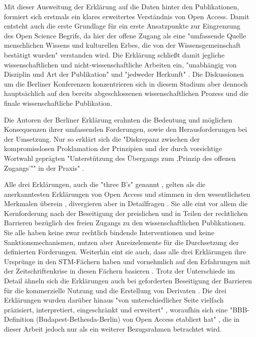 \begin{enumerate}
Mit dieser Ausweitung der Erklärung auf die Daten hinter den Publikationen, formiert sich erstmals ein klares erweitertes Verständnis von Open Access. Damit entsteht auch die erste Grundlage für ein erste Ansatzpunkte zur Eingrenzung des Open Science Begrifs, da hier der offene Zugang als eine "umfassende Quelle menschlichen Wissens und kulturellen Erbes, die von der Wissensgemeinschaft bestätigt wurden" \cite{berliner_erklaerung_2003} verstanden wird. Die Erklärung schließt damit jegliche wissenschaftlichen und nicht-wissenschaftliche Arbeiten ein, "unabhängig von Disziplin und Art der Publikation" und "jedweder Herkunft" \cite{naeder_2010_open}. Die Diskussionen um die Berliner Konferenzen konzentrieren sich in diesem Stadium aber dennoch hauptsächlich auf den bereits abgeschlossenen wissenschaftlichen Prozess und die finale wissenschaftliche Publikation.

Die Autoren der Berliner Erklärung erahnten die Bedeutung und möglichen Konsequenzen ihrer umfassenden Forderungen, sowie den Herausforderungen bei der Umsetzung. Nur so erklärt sich die "Diskrepanz zwischen der kompromisslosen Proklamation der Prinzipien und der durch vorsichtige Wortwahl geprägten "Unterstützung des Übergangs zum ‚Prinzip des offenen Zugangs’"" in der Praxis" \cite{Lossau_oa_2007}.
\end{enumerate}

Alle drei Erklärungen, auch die "three B's" genannt \cite{suber_2004_praising_oa}, gelten als die anerkanntesten Erklärungen von Open Access und stimmen in den wesentlichsten Merkmalen überein \cite{albert_2006_open_implications}, divergieren aber in Detailfragen \cite{naeder_2010_open}. Sie alle eint vor allem die Kernforderung nach der Beseitigung der preislichen und in Teilen der rechtlichen Barrieren bezüglich des freien Zugangs zu den wissenschaftlichen Publikationen. Sie alle haben keine zwar rechtlich bindende Interventionen und keine Sanktionsmechanismen, nutzen aber Anreizelemente für die Durchsetzung der definierten Forderungen. Weiterhin eint sie auch, dass alle drei Erklärungen ihre Ursprünge in den STM-Fächern haben und vornehmlich auf den Erfahrungen mit der Zeitschriftenkrise in diesen Fächern basieren \cite{naeder_2010_open}. Trotz der Unterschiede im Detail ähneln sich die Erklärungen auch bei geforderten Beseitigung der Barrieren für die kommerzielle Nutzung und die Erstellung von Derivaten \cite{CREATe_2014}. Die drei Erklärungen wurden darüber hinaus "von unterschiedlicher Seite vielfach präzisiert, interpretiert, eingeschränkt und erweitert" \cite{naeder_2010_open}, woraufhin sich eine "BBB-
Definition (Budapest-Bethesda-Berlin) von Open Access etabliert hat" \cite{Schirmbacher_oa_2007}, die in dieser Arbeit jedoch nur als ein weiterer Bezugsrahmen betrachtet wird.

